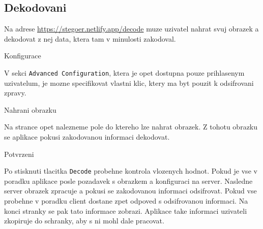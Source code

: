 \subsection{Dekodovani}\label{subsec:dekodovani-dat}
Na adrese \url{https://stegoer.netlify.app/decode} muze uzivatel nahrat svuj
obrazek a dekodovat z nej data, ktera tam v minulosti zakodoval.

\begin{subsubsection}{Konfigurace}\label{subsubsec:dec-konfigurace}

V sekci \texttt{Advanced Configuration}, ktera je opet dostupna pouze
prihlasenym uzivatelum, je mozne specifikovat vlastni klic, ktery ma byt pouzit
k odsifrovani zpravy.

\end{subsubsection}

\begin{subsubsection}{Nahrani obrazku}\label{subsubsec:dec-nahrani-obrazku}

Na strance opet nalezneme pole do ktereho lze nahrat obrazek.
Z tohotu obrazku se aplikace pokusi zakodovanou informaci dekodovat.

\end{subsubsection}

\begin{subsubsection}{Potvrzeni}\label{subsubsec:dec-potvrzeni}

Po stisknuti tlacitka \texttt{Decode} probehne kontrola vlozenych hodnot.
Pokud je vse v poradku aplikace posle pozadavek s obrazkem a konfiguraci na
server.
Nasledne server obrazek zpracuje a pokusi se zakodovanou informaci odsifrovat.
Pokud vse probehne v poradku client dostane zpet odpoved s odsifrovanou
informaci.
Na konci stranky se pak tato informace zobrazi.
Aplikace take informaci uzivateli zkopiruje do schranky, aby s ni mohl dale
pracovat.

\end{subsubsection}
